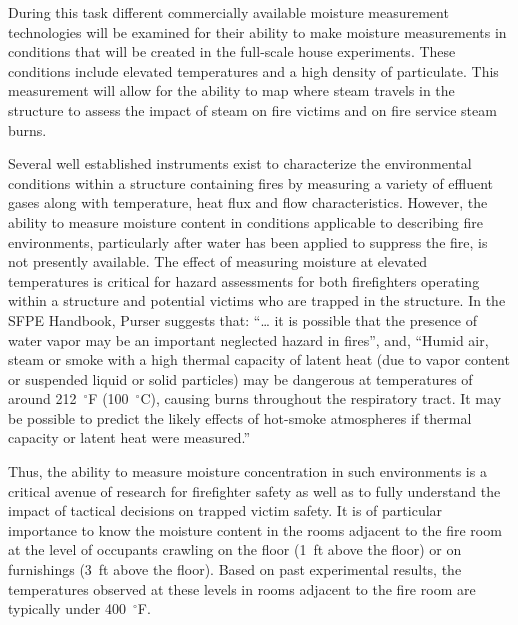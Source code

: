 \documentclass{article}
\begin{document}
\begin{itemize}
During this task different commercially available moisture measurement technologies will be examined for their ability to make moisture measurements in conditions that will be created in the full-scale house experiments. These conditions include elevated temperatures and a high density of particulate. This measurement will allow for the ability to map where steam travels in the structure to assess the impact of steam on fire victims and on fire service steam burns.

Several well established instruments exist to characterize the environmental conditions within a structure containing fires by measuring a variety of effluent gases along with temperature, heat flux and flow characteristics. However, the ability to measure moisture content in conditions applicable to describing fire environments, particularly after water has been applied to suppress the fire, is not presently available. The effect of measuring moisture at elevated temperatures is critical for hazard assessments for both firefighters operating within a structure and potential victims who are trapped in the structure. In the SFPE Handbook, Purser suggests that:  “… it is possible that the presence of water vapor may be an important neglected hazard in fires”, and, “Humid air, steam or smoke with a high thermal capacity of latent heat (due to vapor content or suspended liquid or solid particles) may be dangerous at temperatures of around 212~$^{\circ}$F (100~$^{\circ}$C), causing burns throughout the respiratory tract. It may be possible to predict the likely effects of hot-smoke atmospheres if thermal capacity or latent heat were measured.” 

Thus, the ability to measure moisture concentration in such environments is a critical avenue of research for firefighter safety as well as to fully understand the impact of tactical decisions on trapped victim safety. It is of particular importance to know the moisture content in the rooms adjacent to the fire room at the level of occupants crawling on the floor (1~ft above the floor) or on furnishings (3~ft above the floor). Based on past experimental results, the temperatures observed at these levels in rooms adjacent to the fire room are typically under 400~$^{\circ}$F.  


\end{itemize}
\end{document}
